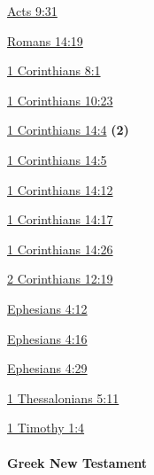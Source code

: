 				\begin{compactdesc}
					\item[{\hyperref[ACTS-9-31]{Acts 9:31}}]
					\item[{\hyperref[ROMANS-14-19]{Romans 14:19}}]
					\item[{\hyperref[1CORINTHIANS-8-1]{1 Corinthians 8:1}}]
					\item[{\hyperref[1CORINTHIANS-10-23]{1 Corinthians 10:23}}]
					\item[{\hyperref[1CORINTHIANS-14-4]{1 Corinthians 14:4}}] \textbf{(2)}
					\item[{\hyperref[1CORINTHIANS-14-5]{1 Corinthians 14:5}}]
					\item[{\hyperref[1CORINTHIANS-14-12]{1 Corinthians 14:12}}]
					\item[{\hyperref[1CORINTHIANS-14-17]{1 Corinthians 14:17}}]
					\item[{\hyperref[1CORINTHIANS-14-26]{1 Corinthians 14:26}}]
					\item[{\hyperref[2CORINTHIANS-12-19]{2 Corinthians 12:19}}]
					\item[{\hyperref[EPHESIANS-4-12]{Ephesians 4:12}}]
					\item[{\hyperref[EPHESIANS-4-16]{Ephesians 4:16}}]
					\item[{\hyperref[EPHESIANS-4-29]{Ephesians 4:29}}]
					\item[{\hyperref[1THESSALONIANS-5-11]{1 Thessalonians 5:11}}]
					\item[{\hyperref[1TIMOTHY-1-4]{1 Timothy 1:4}}]
				\end{compactdesc}
			
		\paragraph{Greek New Testament} %
			\label{EDIFICATION-GREEK}
		
			\subparagraph{\texorpdfstring{}{}}
				\label{OIKODOMEO}
			
